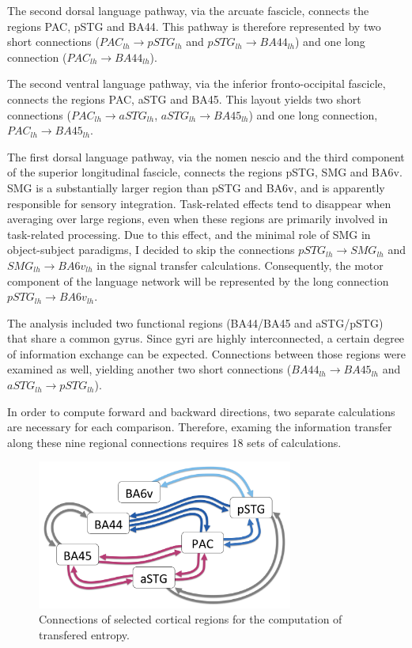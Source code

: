 The second dorsal language pathway, via the arcuate fascicle, connects the regions PAC, pSTG and BA44.
This pathway is therefore represented by two short connections ($PAC_{lh} \rightarrow pSTG_{lh}$ and $pSTG_{lh} \rightarrow BA44_{lh}$) and one long connection ($PAC_{lh} \rightarrow BA44_{lh}$).

The second ventral language pathway, via the inferior fronto-occipital fascicle, connects the regions PAC, aSTG and BA45.
This layout yields two short connections ($PAC_{lh} \rightarrow aSTG_{lh}$, $aSTG_{lh} \rightarrow BA45_{lh}$) and one long connection, $PAC_{lh} \rightarrow BA45_{lh}$.

The first dorsal language pathway, via the nomen nescio and the third component of the superior longitudinal fascicle, connects the regions pSTG, SMG and BA6v.
SMG is a substantially larger region than pSTG and BA6v, and is apparently responsible for sensory integration.
Task-related effects tend to disappear when averaging over large regions, even when these regions are primarily involved in task-related processing.
Due to this effect, and the minimal role of SMG in object-subject paradigms, I decided to skip the connections $pSTG_{lh} \rightarrow SMG_{lh}$ and $SMG_{lh} \rightarrow BA6v_{lh}$ in the signal transfer calculations.
Consequently, the motor component of the language network will be represented by the long connection $pSTG_{lh} \rightarrow BA6v_{lh}$.

The analysis included two functional regions (BA44/BA45 and aSTG/pSTG) that share a common gyrus.
Since gyri are highly interconnected, a certain degree of information exchange can be expected.
Connections between those regions were examined as well, yielding another two short connections ($BA44_{lh} \rightarrow BA45_{lh}$ and $aSTG_{lh} \rightarrow pSTG_{lh}$).

In order to compute forward and backward directions, two separate calculations are necessary for each comparison.
Therefore, examing the information transfer along these nine regional connections requires 18 sets of calculations.

\begin{figure}[h]
\begin{center}
\vspace{7mm}
\includegraphics[width=0.75\textwidth]{pics/3_4_regions.png}
\caption{\label{3.4.regions} Connections of selected cortical regions for the computation of transfered entropy.}
\end{center}
\end{figure}

